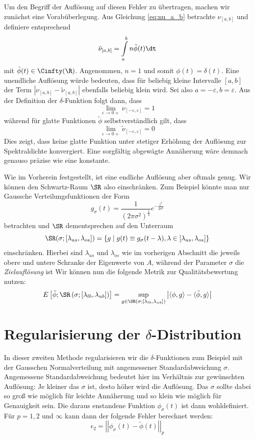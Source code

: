 Um den Begriff der Auflösung auf diesen Fehler zu übertragen,
machen wir zunächst eine Vorabüberlegung.
Aus Gleichung \ref{eq:nu_a_b} betrachte $\nu_{[a, b]}$ und definiere entsprechend
$$\tilde{\nu}_{[a, b]} = \int\limits_a^b n \tilde{\phi}(t) \dt$$
mit $\tilde{\phi}(t) \in \Cinfty(\R)$.
Angenommen, $n = 1$ und somit $\phi(t) = \delta(t)$.
Eine unendliche Auflösung würde bedeuten,
dass für beliebig kleine Intervalle $[a ,b]$ der Term $\left| \nu_{[a, b]} - \tilde{\nu}_{[a, b]} \right|$ ebenfalls beliebig klein wird.
Sei also $a = -\varepsilon, b = \varepsilon$.
Aus der Definition der $\delta$-Funktion folgt dann, dass
$$\lim \limits_{\varepsilon \to 0+} \nu_{[-\varepsilon, \varepsilon]} = 1$$
während für glatte Funktionen $\tilde{\phi}$ selbstverständlich gilt, dass
$$\lim \limits_{\varepsilon \to 0+} \tilde{\nu}_{[-\varepsilon, \varepsilon]} = 0$$
Dies zeigt, dass keine glatte Funktion unter stetiger Erhöhung der Auflösung zur Spektraldichte konvergiert.
Eine sorgfältig abgewägte Annäherung wäre demnach genauso präzise wie eine konstante.

Wie im Vorherein festgestellt,
ist eine endliche Auflösung aber oftmals genug.
Wir können den Schwartz-Raum $\SR$ also einschränken.
Zum Beispiel könnte man nur Gaussche Verteilungsfunktionen der Form
$$g_{\sigma}(t) = \frac{1}{(2\pi\sigma^2)^\frac{1}{2}}e^{-\frac{t^2}{2\sigma^2}}$$
betrachten und $\SR$ dementsprechen auf den Unterraum
$$\SR(\sigma;[\lambda_{us}, \lambda_{os}]) = \left\{ g \mid g(t) \equiv g_{\sigma}(t - \lambda), \lambda \in [\lambda_{us}, \lambda_{os}] \right\}$$
einschränken.
Hierbei sind $\lambda_{us}$ und $\lambda_{os}$ wie im vorherigen Abschnitt die jeweils obere und untere Schranke der Eigenwerte von $A$,
während der Parameter $\sigma$ die \emph{Zielauflösung} ist
Wir können nun die folgende Metrik zur Qualitätsbewertung nutzen:
\begin{equation} \label{eq:error}
    E\left[\tilde{\phi};\SR\left(\sigma; \left[\lambda_{lb}, \lambda_{ub} \right] \right)\right] = \sup_{g \in \SR(\sigma;[\lambda_{lb}, \lambda_{ub}])} \left| \langle \phi, g \rangle - \langle \tilde{\phi}, g \rangle \right|
\end{equation}

\section{Regularisierung der $\delta$-Distribution}
In dieser zweiten Methode regularisieren wir die $\delta$-Funktionen zum Beispiel mit der Gausschen Normalverteilung mit angemessener Standardabweichung $\sigma$.
Angemessene Standardabweichung bedeutet hier im Verhältnis zur gewünschten Auflösung:
Je kleiner das $\sigma$ ist, desto höher wird die Auflösung.
Das $\sigma$ sollte dabei so groß wie möglich für leichte Annäherung und so klein wie möglich für Genauigkeit sein.
Die daraus enstandene Funktion $\phi_{\sigma}(t)$ ist dann wohldefiniert.
Für $p=1, 2$ und $\infty$ kann dann der folgende Fehler berechnet werden:
$$\epsilon_2 = \left|\left| \phi_{\sigma}(t) - \tilde{\phi}(t) \right|\right|_p$$

